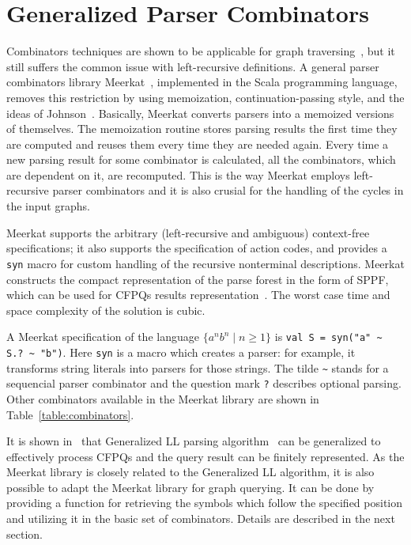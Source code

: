 \section{Generalized Parser Combinators}
\label{sec:GLL}

Combinators techniques are shown to be applicable for graph traversing~\cite{ScalaGraphParsing}, but it still suffers the common issue with left-recursive definitions.
A general parser combinators library Meerkat~\cite{Meerkat}, implemented in the Scala programming language, removes this restriction by using memoization, continuation-passing style, and the ideas of Johnson~\cite{Johnson}.
Basically, Meerkat converts parsers into a memoized versions of themselves.
The memoization routine stores parsing results the first time they are computed and reuses them every time they are needed again.
Every time a new parsing result for some combinator is calculated, all the combinators, which are dependent on it, are recomputed.
This is the way Meerkat employs left-recursive parser combinators and it is also crusial for the handling of the cycles in the input graphs.

Meerkat supports the arbitrary (left-recursive and ambiguous) context-free specifications; it also supports the specification of action codes, and provides a \lstinline{syn} macro for custom handling of the recursive nonterminal descriptions.
Meerkat constructs the compact representation of the parse forest in the form of SPPF, which can be used for CFPQs results representation~\cite{GrigorevR16}.
The worst case time and space complexity of the solution is cubic.

A Meerkat specification of the language $\{a^n b^n \mid n \geq 1\}$ is \lstinline{val S = syn("a" ~ S.? ~ "b")}. Here \lstinline{syn} is a macro which creates a parser: for example, it transforms string literals into parsers for those strings. The tilde \lstinline{~} stands for a sequencial parser combinator and the question mark \lstinline{?} describes optional parsing. Other combinators available in the Meerkat library are shown in Table~\ref{table:combinators}.

It is shown in~\cite{GrigorevR16} that Generalized LL parsing algorithm~\cite{scott2010gll} can be generalized to effectively process CFPQs and the query result can be finitely represented.
As the Meerkat library is closely related to the Generalized LL algorithm, it is also possible to adapt the Meerkat library for graph querying.
It can be done by providing a function for retrieving the symbols which follow the specified position and utilizing it in the basic set of combinators.
Details are described in the next section.

